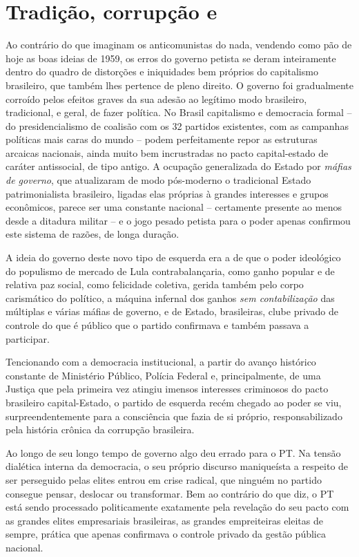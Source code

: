   \section{Tradição, corrupção e
  }\label{tradiuxe7uxe3o-corrupuxe7uxe3o-e-pt}

Ao contrário do que imaginam os anticomunistas do nada, vendendo como
pão de hoje as boas ideias de 1959, os erros do governo petista se deram
inteiramente dentro do quadro de distorções e iniquidades bem próprios
do capitalismo brasileiro, que também lhes pertence de pleno direito. O
governo foi gradualmente corroído pelos efeitos graves da sua adesão ao
legítimo modo brasileiro, tradicional, e geral, de fazer política. No
Brasil capitalismo e democracia formal -- do presidencialismo de
coalisão com os 32 partidos existentes, com as campanhas políticas mais
caras do mundo -- podem perfeitamente repor as estruturas arcaicas
nacionais, ainda muito bem incrustradas no pacto capital-estado de
caráter antissocial, de tipo antigo. A ocupação generalizada do Estado
por \emph{máfias de governo}, que atualizaram de modo pós-moderno o
tradicional Estado patrimonialista brasileiro, ligadas elas próprias à
grandes interesses e grupos econômicos, parece ser uma constante
nacional -- certamente presente ao menos desde a ditadura militar -- e o
jogo pesado petista para o poder apenas confirmou este sistema de
razões, de longa duração.

A ideia do governo deste novo tipo de esquerda era a de que o poder
ideológico do populismo de mercado de Lula contrabalançaria, como ganho
popular e de relativa paz social, como felicidade coletiva, gerida
também pelo corpo carismático do político, a máquina infernal dos ganhos
\emph{sem contabilização} das múltiplas e várias máfias de governo, e de
Estado, brasileiras, clube privado de controle do que é público que o
partido confirmava e também passava a participar.

Tencionando com a democracia institucional, a partir do avanço histórico
constante de Ministério Público, Polícia Federal e, principalmente, de
uma Justiça que pela primeira vez atingiu imensos interesses criminosos
do pacto brasileiro capital-Estado, o partido de esquerda recém chegado
ao poder se viu, surpreendentemente para a consciência que fazia de si
próprio, responsabilizado pela história crônica da corrupção brasileira.

Ao longo de seu longo tempo de governo algo deu errado para o PT. Na
tensão dialética interna da democracia, o seu próprio discurso
maniqueísta a respeito de ser perseguido pelas elites entrou em crise
radical, que ninguém no partido consegue pensar, deslocar ou
transformar. Bem ao contrário do que diz, o PT está sendo processado
politicamente exatamente pela revelação do seu pacto com as grandes
elites empresariais brasileiras, as grandes empreiteiras eleitas de
sempre, prática que apenas confirmava o controle privado da gestão
pública nacional.

